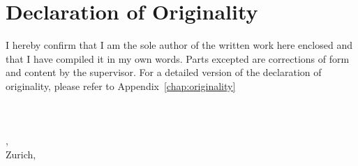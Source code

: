 \makeatletter
\chapter*{Declaration of Originality}
I hereby confirm that I am the sole author of the written work here
enclosed and that I have compiled it in my own words. Parts excepted
are corrections of form and content by the supervisor. For a detailed
version of the declaration of originality, please refer to
Appendix~\ref{chap:originality}
\\
\\
\\
\\
\@author,\\
Zurich, \@date\\

